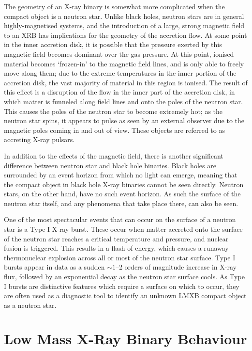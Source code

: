 \par The geometry of an X-ray binary is somewhat more complicated when the compact object is a neutron star.  Unlike black holes, neutron stars are in general highly-magnetised systems, and the introduction of a large, strong magnetic field to an XRB has implications for the geometry of the accretion flow.  At some point in the inner accretion disk, it is possible that the pressure exerted by this magnetic field becomes dominant over the gas pressure.  At this point, ionised material becomes `frozen-in' to the magnetic field lines, and is only able to freely move along them; due to the extreme temperatures in the inner portion of the accretion disk, the vast majority of material in this region is ionised.  The result of this effect is a disruption of the flow in the inner part of the accretion disk, in which matter is funneled along field lines and onto the poles of the neutron star.  This causes the poles of the neutron star to become extremely hot; as the neutron star spins, it appears to pulse as seen by an external observer due to the magnetic poles coming in and out of view.  These objects are referred to as accreting X-ray pulsars.
\par In addition to the effects of the magnetic field, there is another significant difference between neutron star and black hole binaries.  Black holes are surrounded by an event horizon from which no light can emerge, meaning that the compact object in black hole X-ray binaries cannot be seen directly.  Neutron stars, on the other hand, have no such event horizon.  As such the surface of the neutron star itself, and any phenomena that take place there, can also be seen.
\par One of the most spectacular events that can occur on the surface of a neutron star is a Type I X-ray burst.  These occur when matter accreted onto the surface of the neutron star reaches a critical temperature and pressure, and nuclear fusion is triggered.  This results in a flash of energy, which causes a runaway thermonuclear explosion across all or most of the neutron star surface.  Type I bursts appear in data as a sudden $\sim1$--2 orders of magnitude increase in X-ray flux, followed by an exponential decay as the neutron star surface cools.  As Type I bursts are distinctive features which require a surface on which to occur, they are often used as a diagnostic tool to identify an unknown LMXB compact object as a neutron star.

\section{Low Mass X-Ray Binary Behaviour}

